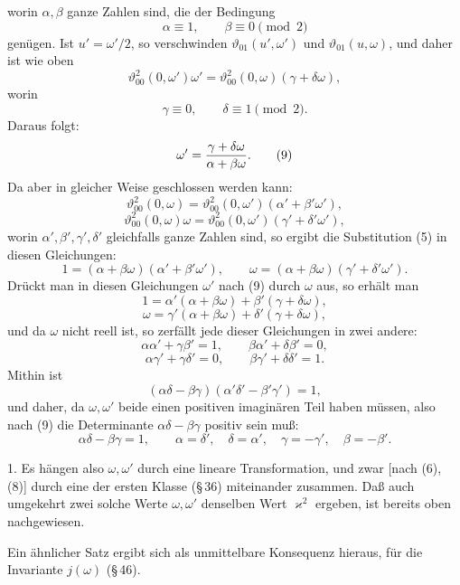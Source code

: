 \documentclass[11pt]{article}
\providecommand{\tht}{\vartheta}
\begin{document}
worin $\alpha,\beta$ ganze Zahlen sind, die der Bedingung
\begin{equation}
\alpha\equiv1,
\qquad
\beta\equiv0\pmod 2
\tag{6}
\end{equation}
genügen. Ist $u'=\omega'/2$, so verschwinden $\tht_{01}(u',\omega')$ und $\tht_{01}(u,\omega)$, und daher ist wie oben
\begin{equation}
\tht_{00}^2(0,\omega')\omega'=\tht_{00}^2(0,\omega)(\gamma+\delta\omega),
\tag{7}
\end{equation}
worin
\begin{equation}
\gamma\equiv0,
\qquad
\delta\equiv1\pmod 2.
\tag{8}
\end{equation}
Daraus folgt:
\begin{equation}
\omega'={\gamma+\delta\omega\over\alpha+\beta\omega}.
\tag{9}
\end{equation}
Da aber in gleicher Weise geschlossen werden kann:
\[
\tht_{00}^2(0,\omega)=\tht_{00}^2(0,\omega')(\alpha'+\beta'\omega'),
\]
\[
\tht_{00}^2(0,\omega)\omega=\tht_{00}^2(0,\omega')(\gamma'+\delta'\omega'),
\]
worin $\alpha',\beta',\gamma',\delta'$ gleichfalls ganze Zahlen sind, so ergibt die Substitution (5) in diesen Gleichungen:
\[
1=(\alpha+\beta\omega)(\alpha'+\beta'\omega'),
\qquad
\omega=(\alpha+\beta\omega)(\gamma'+\delta'\omega').
\]
Drückt man in diesen Gleichungen $\omega'$ nach (9) durch $\omega$ aus, so erhält man
\[
1=\alpha'(\alpha+\beta\omega)+\beta'(\gamma+\delta\omega),
\]
\[
\omega=\gamma'(\alpha+\beta\omega)+\delta'(\gamma+\delta\omega),
\]
und da $\omega$ nicht reell ist, so zerfällt jede dieser Gleichungen in zwei andere:
\[
\alpha\alpha'+\gamma\beta'=1,
\qquad
\beta\alpha'+\delta\beta'=0,
\]
\[
\alpha\gamma'+\gamma\delta'=0,
\qquad
\beta\gamma'+\delta\delta'=1.
\]
Mithin ist
\[
(\alpha\delta-\beta\gamma)(\alpha'\delta'-\beta'\gamma')=1,
\]
und daher, da $\omega,\omega'$ beide einen positiven imaginären Teil haben müssen, also nach (9) die Determinante $\alpha\delta-\beta\gamma$ positiv sein muß:
\[
\alpha\delta-\beta\gamma=1,
\qquad
\alpha=\delta',\quad \delta=\alpha',\quad \gamma=-\gamma',\quad \beta=-\beta'.
\]

1. Es hängen also $\omega,\omega'$ durch eine lineare Transformation, und zwar [nach (6), (8)] durch eine der ersten Klasse (\S\,36) miteinander zusammen. Daß auch umgekehrt zwei solche Werte $\omega,\omega'$ denselben Wert $\varkappa^2$ ergeben, ist bereits oben nachgewiesen.

Ein ähnlicher Satz ergibt sich als unmittelbare Konsequenz hieraus, für die Invariante $j(\omega)$ (\S\,46).
\end{document}
